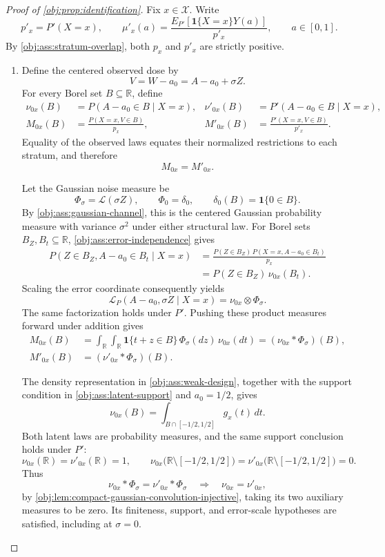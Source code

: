 \documentclass[11pt]{article}
\begin{document}
\begin{proof}[Proof of \cref{obj:prop:identification}]
Fix \(x\in\mathcal X\). Write
\[
p'_x=P'(X=x),
\qquad
\mu'_x(a)=\frac{E_{P'}[\mathbf1\{X=x\}Y(a)]}{p'_x},
\qquad a\in[0,1].
\]
By \cref{obj:ass:stratum-overlap}, both \(p_x\) and \(p'_x\) are strictly positive.

\begin{enumerate}
\item Define the centered observed dose by
\[
V=W-a_0=A-a_0+\sigma Z.
\]
For every Borel set \(B\subseteq\mathbb R\), define
\[
\begin{aligned}
\nu_{0x}(B)&=P(A-a_0\in B\mid X=x),
&
\nu'_{0x}(B)&=P'(A-a_0\in B\mid X=x),\\
M_{0x}(B)&=\frac{P(X=x,V\in B)}{p_x},
&
M'_{0x}(B)&=\frac{P'(X=x,V\in B)}{p'_x}.
\end{aligned}
\]
Equality of the observed laws equates their normalized restrictions to each stratum, and therefore
\[
M_{0x}=M'_{0x}.
\]

Let the Gaussian noise measure be
\[
\Phi_\sigma=\mathcal L(\sigma Z),
\qquad
\Phi_0=\delta_0,
\qquad
\delta_0(B)=\mathbf1\{0\in B\}.
\]
By \cref{obj:ass:gaussian-channel}, this is the centered Gaussian probability measure with variance \(\sigma^2\) under either structural law. For Borel sets \(B_Z,B_t\subseteq\mathbb R\), \cref{obj:ass:error-independence} gives
\[
\begin{aligned}
P(Z\in B_Z,A-a_0\in B_t\mid X=x)
&=\frac{P(Z\in B_Z)\,P(X=x,A-a_0\in B_t)}{p_x}\\
&=P(Z\in B_Z)\,\nu_{0x}(B_t).
\end{aligned}
\]
Scaling the error coordinate consequently yields
\[
\mathcal L_P(A-a_0,\sigma Z\mid X=x)
=\nu_{0x}\otimes\Phi_\sigma.
\]
The same factorization holds under \(P'\). Pushing these product measures forward under addition gives
\[
\begin{aligned}
M_{0x}(B)
&=\int_{\mathbb R}\int_{\mathbb R}
\mathbf1\{t+z\in B\}\,\Phi_\sigma(dz)\,\nu_{0x}(dt)
=(\nu_{0x}*\Phi_\sigma)(B),\\
M'_{0x}(B)&=(\nu'_{0x}*\Phi_\sigma)(B).
\end{aligned}
\]

The density representation in \cref{obj:ass:weak-design}, together with the support condition in \cref{obj:ass:latent-support} and \(a_0=1/2\), gives
\[
\nu_{0x}(B)=\int_{B\cap[-1/2,1/2]}g_x(t)\,dt.
\]
Both latent laws are probability measures, and the same support conclusion holds under \(P'\):
\[
\nu_{0x}(\mathbb R)=\nu'_{0x}(\mathbb R)=1,
\qquad
\nu_{0x}\bigl(\mathbb R\setminus[-1/2,1/2]\bigr)
=\nu'_{0x}\bigl(\mathbb R\setminus[-1/2,1/2]\bigr)=0.
\]
Thus
\[
\nu_{0x}*\Phi_\sigma=\nu'_{0x}*\Phi_\sigma
\quad\Longrightarrow\quad
\nu_{0x}=\nu'_{0x},
\]
by \cref{obj:lem:compact-gaussian-convolution-injective}, taking its two auxiliary measures to be zero. Its finiteness, support, and error-scale hypotheses are satisfied, including at \(\sigma=0\).


\end{enumerate}
\end{proof}
\end{document}

